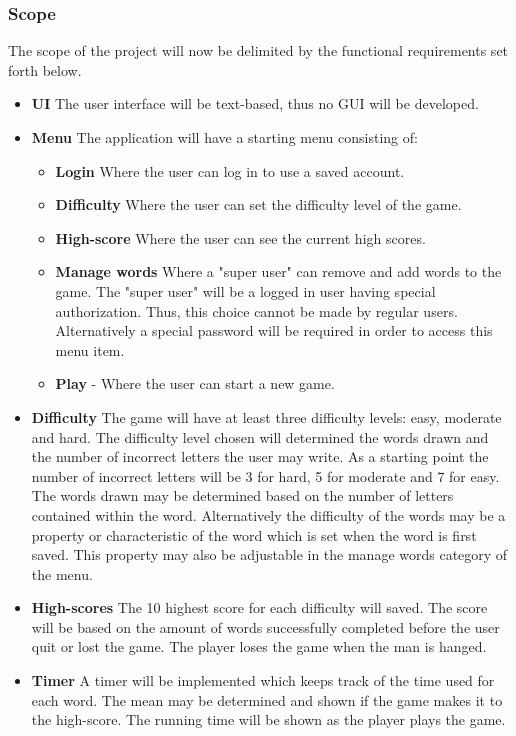 \documentclass[12pt, letterpaper]{article}
\begin{document}
\subsubsection{Scope}
The scope of the project will now be delimited by the functional requirements set forth below.
\begin{itemize}
	\item \textbf{UI} The user interface will be text-based, thus no GUI will be developed.
	\item \textbf{Menu} The application will have a starting menu consisting of:
	\begin{itemize}
		\item \textbf{Login} Where the user can log in to use a saved account.
		\item \textbf{Difficulty} Where the user can set the difficulty level of the game.
		\item \textbf{High-score} Where the user can see the current high scores.
		\item \textbf{Manage words} Where a "super user" can remove and add words to the game. The "super user" will be a logged in user having special authorization. Thus, this choice cannot be made by regular users. Alternatively a special password will be required in order to access this menu item.
		\item \textbf{Play} - Where the user can start a new game.
	\end{itemize}
	\item \textbf{Difficulty} The game will have at least three difficulty levels: easy, moderate and hard. The difficulty level chosen will determined the words drawn and the number of incorrect letters the user may write. As a starting point the number of incorrect letters will be 3 for hard, 5 for moderate and 7 for easy. The words drawn may be determined based on the number of letters contained within the word. Alternatively the difficulty of the words may be a property or characteristic of the word which is set when the word is first saved. This property may also be adjustable in the manage words category of the menu.
	\item \textbf{High-scores} The 10 highest score for each difficulty will saved. The score will be based on the amount of words successfully completed before the user quit or lost the game. The player loses the game when the man is hanged.
	\item \textbf{Timer} A timer will be implemented which keeps track of the time used for each word. The mean may be determined and shown if the game makes it to the high-score. The running time will be shown as the player plays the game.

\end{itemize}
\end{document}

